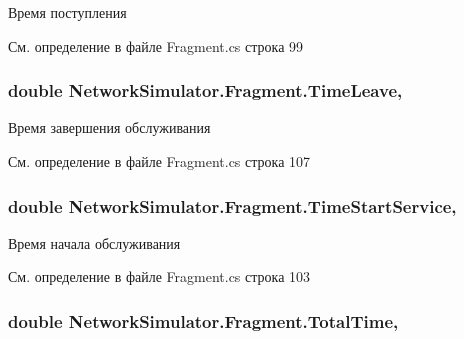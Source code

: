Время поступления 



См. определение в файле Fragment.\+cs строка 99

\subsubsection[{\texorpdfstring{Time\+Leave}{TimeLeave}}]{\setlength{\rightskip}{0pt plus 5cm}double Network\+Simulator.\+Fragment.\+Time\+Leave\hspace{0.3cm}{\ttfamily [get]}, {\ttfamily [set]}}\hypertarget{class_network_simulator_1_1_fragment_ab4ea6557da38174fdc08f73e39d7ff4c}{}\label{class_network_simulator_1_1_fragment_ab4ea6557da38174fdc08f73e39d7ff4c}


Время завершения обслуживания 



См. определение в файле Fragment.\+cs строка 107

\subsubsection[{\texorpdfstring{Time\+Start\+Service}{TimeStartService}}]{\setlength{\rightskip}{0pt plus 5cm}double Network\+Simulator.\+Fragment.\+Time\+Start\+Service\hspace{0.3cm}{\ttfamily [get]}, {\ttfamily [set]}}\hypertarget{class_network_simulator_1_1_fragment_a5a585d4c4fecc4f03d5fb136cc8c8f5e}{}\label{class_network_simulator_1_1_fragment_a5a585d4c4fecc4f03d5fb136cc8c8f5e}


Время начала обслуживания 



См. определение в файле Fragment.\+cs строка 103

\subsubsection[{\texorpdfstring{Total\+Time}{TotalTime}}]{\setlength{\rightskip}{0pt plus 5cm}double Network\+Simulator.\+Fragment.\+Total\+Time\hspace{0.3cm}{\ttfamily [get]}, {\ttfamily [set]}}\hypertarget{class_network_simulator_1_1_fragment_a93384e51e479637c537049d881ac9686}{}\label{class_network_simulator_1_1_fragment_a93384e51e479637c537049d881ac9686}


